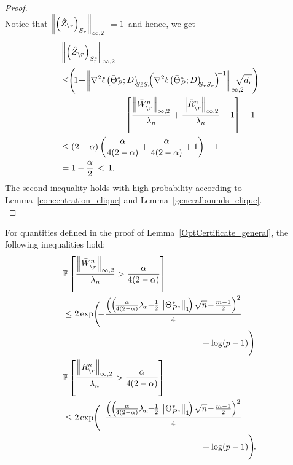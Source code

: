 \begin{proof}
\begin{equation}
\end{equation}
Notice that \footnotesize$\left\|\left(\hat{Z}_{\backslash r}\right)_{S_{r}}\right\|_{\infty,2}$ \normalsize$=1\,$ and hence, we get
\begin{equation}
\begin{aligned}
&\norm{\left(\hat{\dual}_{\backslash\svert}\right)_{\support_\svert^c}}{\infty,2}\\ &\leq\!\! \left(\!1\!+\!\norm{\nabla^2\ell\left(\bar{\Theta}^*_P;D\right)_{\!\!\support_\svert^c\support_\svert}\!\!\! \left(\nabla^2\ell\left(\bar{\Theta}^*_P;D\right)_{\!\!\support_\svert\support_\svert}\right)^{\!\!-1}}{\infty,2} \!\!\!\!\!\!\!\sqrt{d_\svert}\right)\\ &\qquad\qquad\qquad\qquad\!\!\!\left[\frac{\norm{\bar{W}_{\backslash\svert}^n}{\infty,2}}{\regpar_n} +\frac{\norm{\bar{R}_{\backslash\svert}^n}{\infty,2}}{\regpar_n}+1\right]-1\\
&\leq(2-\alpha)\left(\frac{\alpha}{4(2-\alpha)}+\frac{\alpha}{4(2-\alpha)}+1\right)-1\\ &= 1-\frac{\alpha}{2} \,<\, 1.
\end{aligned}
\nonumber
\end{equation}
The second inequality holds with high probability according to Lemma~\ref{concentration_clique} and Lemma~\ref{generalbounds_clique}.\\
\end{proof}

\begin{lemma}
For quantities defined in the proof of Lemma~\ref{OptCertificate_general}, the following inequalities hold:
\begin{equation}
\begin{aligned}
&\mathbb{P}\left[\frac{\norm{\bar{W}_{\backslash\svert}^n}{\infty,2}}{\lambda_n} > \frac{\alpha}{4(2-\alpha)}\right]\\ &\leq 2\exp\Biggr(\!\!\!-\!\frac{\left(\left(\!\frac{\alpha}{4(2-\alpha)}\regpar_n\!\!-\!\!\frac{1}{2}\norm{\bar{\Theta}^*_{P^c}}{1}\!\right)\sqrt{n} \!-\! \frac{m-1}{2}\right)^2}{4}\\ &\qquad\qquad\qquad\qquad\qquad\qquad\qquad\qquad+\log(p-1)\Biggr)\\
&\mathbb{P}\left[\frac{\norm{\bar{R}_{\backslash\svert}^n}{\infty,2}}{\regpar_n}>\frac{\alpha}{4(2-\alpha)}\right]\\ &\leq 2\exp\Biggr(\!\!\!-\!\frac{\left(\left(\!\frac{\alpha}{4(2-\alpha)}\regpar_n\!\!-\!\!\frac{1}{2}\norm{\bar{\Theta}^*_{P^c}}{1}\!\right)\sqrt{n} \!-\! \frac{m-1}{2}\right)^2}{4}\\ &\qquad\qquad\qquad\qquad\qquad\qquad\qquad\qquad+\log(p-1)\Biggr)\!.\\
\end{aligned}
\nonumber
\end{equation}
\label{generalbounds_clique}
\end{lemma}

